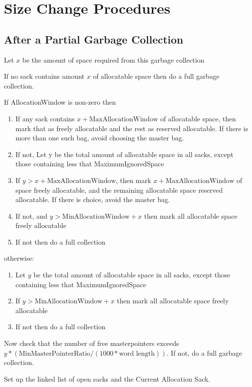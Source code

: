 \documentclass[12pt]{article}
\begin{document}
\section{Size Change Procedures}

\subsection{After a Partial Garbage Collection}

Let $x$ be the amount of space required from this garbage collection

If no sack contains amount $x$ of allocatable space then do a full
garbage collection.

If AllocationWindow is non-zero then 
\begin{enumerate}
\item If any sack contains $x + \mbox{MaxAllocationWindow}$ 
of allocatable space, then 
mark that as freely allocatable and the rest as reserved
allocatable. If there is more than one such bag, avoid choosing the
master bag.
\item If not, Let y be the total amount of allocatable space in all sacks,
except those containing less that MaximumIgnoredSpace
\item If $y > x + \mbox{MaxAllocationWindow}$, then mark $x +
\mbox{MaxAllocationWindow}$ of space
freely allocatable, and the remaining allocatable space reserved
allocatable. If there is choice, avoid the master bag.
\item If not, and $y > \mbox{MinAllocationWindow}+x$ then mark all allocatable
space freely allocatable
\item If not then do a full collection
\end{enumerate}
otherwise:
\begin{enumerate}
\item  Let $y$ be the total amount of allocatable space in all sacks,
except those containing less that MaximumIgnoredSpace
\item If $y >  \mbox{MinAllocationWindow}+x$ then mark all allocatable space 
 freely allocatable
\item If not then do a full collection
\end{enumerate}

Now check that the number of free masterpointers exceeds
$y*(\mbox{MinMasterPointerRatio}/(1000* \mbox{word length}))$. 
If not, do a full garbage collection.


Set up the linked list of open sacks and the Current Allocation Sack. 
\end{document}
